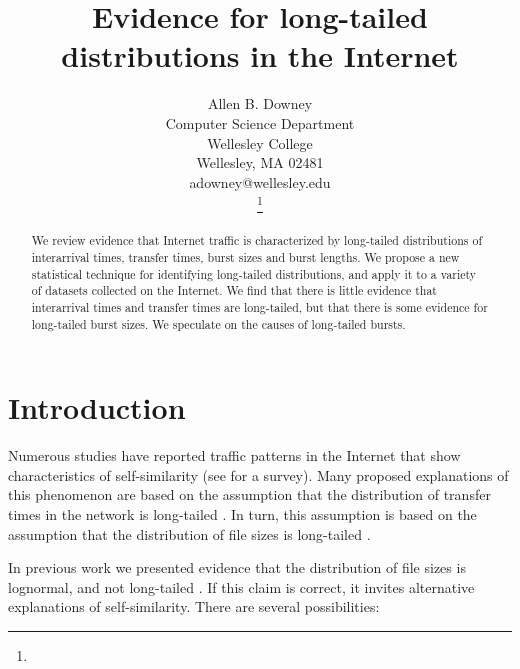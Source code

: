 \documentclass[twocolumn,11pt]{infocom}
\begin{document}
\title{Evidence for long-tailed distributions in the Internet}

\author{Allen B. Downey \\
Computer Science Department \\
Wellesley College \\
Wellesley, MA 02481 \\
adowney@wellesley.edu\\
\thanks{\vspace{1in}}
}

\maketitle
\thispagestyle{empty}
\pagestyle{empty}

\begin{abstract}
We review evidence that Internet traffic is characterized by
long-tailed distributions of interarrival times, transfer times, burst
sizes and burst lengths.  We propose a new statistical technique for
identifying long-tailed distributions, and apply it to a variety of
datasets collected on the Internet.  We find that there is little
evidence that interarrival times and transfer times are long-tailed,
but that there is some evidence for long-tailed burst sizes.  We
speculate on the causes of long-tailed bursts.
\end{abstract}

\section{Introduction}
\label {intro}

Numerous studies have reported traffic patterns in the Internet that
show characteristics of self-similarity (see \cite{ParkWillinger00}
for a survey).  Many proposed explanations of this phenomenon are
based on the assumption that the distribution of transfer times in the
network is long-tailed \cite{PaxsonFloyd95} \cite{ParulekarMakowski96}
\cite{WillingerTaqquShermanWilson95}
\cite{FeldmannGilbertHuangWillinger99}.  In turn, this assumption is
based on the assumption that the distribution of file sizes is
long-tailed \cite{ParkKimCrovella96} \cite{CrovellaTaqquBestavros99}.

In previous work we presented evidence that the distribution of file sizes
is lognormal, and not long-tailed \cite{Downey01}.  If this claim is
correct, it invites alternative explanations of self-similarity.
There are several possibilities:
\end{document}
